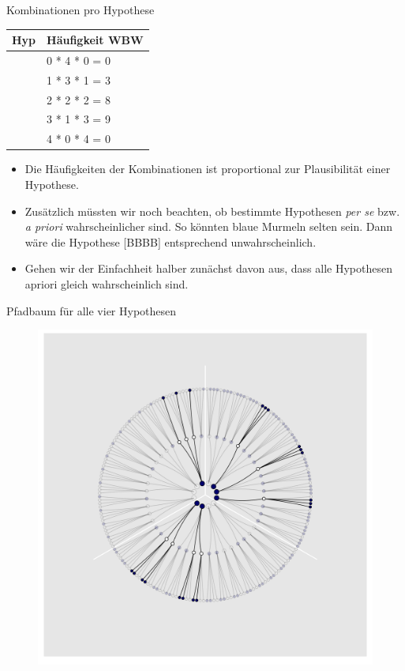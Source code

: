\documentclass[
  ngerman,
  ignorenonframetext,
]{beamer}
\begin{document}
\begin{frame}{Kombinationen pro Hypothese}
\protect\hypertarget{kombinationen-pro-hypothese}{}
\begin{tabular}{l|l}
\hline
Hyp & Häufigkeit WBW\\
\hline
[W W W W] & 0 * 4 * 0 = 0\\
\hline
[B W W W] & 1 * 3 * 1 = 3\\
\hline
[B B W W] & 2 * 2 * 2 = 8\\
\hline
[B B B W] & 3 * 1 * 3 = 9\\
\hline
[B B B B] & 4 * 0 * 4 = 0\\
\hline
\end{tabular}

\begin{itemize}
\item
  Die Häufigkeiten der Kombinationen ist proportional zur Plausibilität
  einer Hypothese.
\item
  Zusätzlich müssten wir noch beachten, ob bestimmte Hypothesen
  \emph{per se} bzw. \emph{a priori} wahrscheinlicher sind. So könnten
  blaue Murmeln selten sein. Dann wäre die Hypothese {[}BBBB{]}
  entsprechend unwahrscheinlich.
\item
  Gehen wir der Einfachheit halber zunächst davon aus, dass alle
  Hypothesen apriori gleich wahrscheinlich sind.
\end{itemize}
\end{frame}

\begin{frame}{Pfadbaum für alle vier Hypothesen}
\protect\hypertarget{pfadbaum-fuxfcr-alle-vier-hypothesen}{}
\begin{figure}[H]
\includegraphics[width=0.7\linewidth]{img/img2118} \end{figure}
\end{frame}
\end{document}
